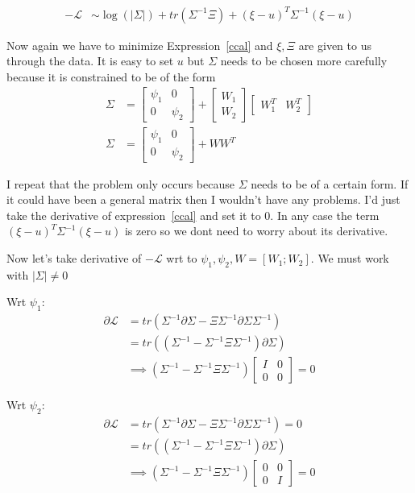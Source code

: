 \documentclass[11pt]{article}
\renewcommand{\det}[1]{|#1|}
\begin{document}
\begin{align}
  \mathcal{-L}  &\sim \log(\det{\Sigma}) + tr(\Sigma^{-1}\Xi)+(\xi -
  u)^T\Sigma^{-1}(\xi - u) \label{ccal}
\end{align}

Now again we have to minimize Expression~\ref{ccal} and $\xi, \Xi$ are
given to us through the data. It is easy to set $u$ but $\Sigma$ needs
to be chosen more carefully because it is constrained to be of the
form
\begin{align}
  \Sigma &= \begin{bmatrix} \psi_1 & 0 \\ 0 & \psi_2 \end{bmatrix} + \begin{bmatrix} W_1 \\ W_2 \end{bmatrix}  \begin{bmatrix} W_1^T &    W_2^T \end{bmatrix}\\
  \Sigma &= \begin{bmatrix} \psi_1 & 0 \\ 0 &
    \psi_2 \end{bmatrix} + W W^T
\end{align}

I repeat that the problem only occurs because $\Sigma$ needs to be of
a certain form. If it could have been a general matrix then I wouldn't
have any problems. I'd just take the derivative of
expression~\ref{ccal} and set it to 0. In any case the term
$(\xi - u)^T\Sigma^{-1}(\xi - u)$ is zero so we dont need to worry
about its derivative.

Now let's take derivative of $-\mathcal{L}$ wrt to $\psi_1,
\psi_2, W=[W_1; W_2]$. We must work with $\det{\Sigma}\ne 0$

Wrt $\psi_1$:
\begin{align}
  \partial \mathcal{L} &= tr(\Sigma^{-1} \partial \Sigma - \Xi\Sigma^{-1}\partial\Sigma\Sigma^{-1})\\
  &=  tr((\Sigma^{-1}  - \Sigma^{-1}\Xi\Sigma^{-1})\partial\Sigma)\\
  &\implies (\Sigma^{-1}  - \Sigma^{-1}\Xi\Sigma^{-1}) \begin{bmatrix}I & 0\\ 0 & 0\end{bmatrix} = 0
\end{align}

Wrt $\psi_2$:
\begin{align}
  \partial \mathcal{L} &= tr(\Sigma^{-1} \partial \Sigma - \Xi\Sigma^{-1}\partial\Sigma\Sigma^{-1}) = 0\\
  &=  tr((\Sigma^{-1}  - \Sigma^{-1}\Xi\Sigma^{-1})\partial\Sigma)\\
  &\implies (\Sigma^{-1}  - \Sigma^{-1}\Xi\Sigma^{-1}) \begin{bmatrix}0 & 0\\ 0 & I\end{bmatrix} = 0
\end{align}
\end{document}
